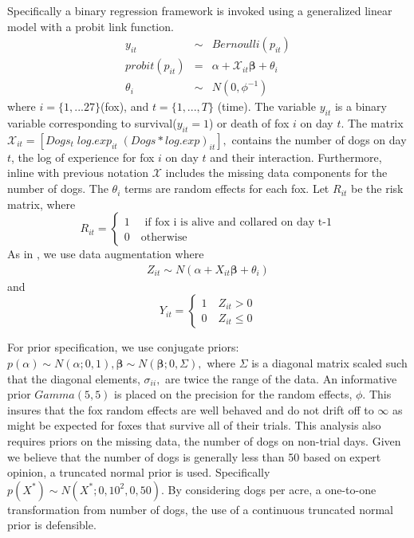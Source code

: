 \documentclass[aoas,preprint]{imsart}
\numberwithin{equation}{section}
\theoremstyle{plain}
\begin{document}
Specifically a binary regression framework is invoked using a generalized linear model with a probit link function.
\begin{eqnarray}
y_{it} &\sim& Bernoulli(p_{it}) \\
probit(p_{it}) & = & \alpha + \mathcal{X}_{it}\boldsymbol{\beta} + \theta_{i} \\
\theta_{i} &\sim& N(0, \phi^{-1})
\end{eqnarray}
where $i = \{1,...27\} $(fox), and $t= \{1,...,T\}$ (time). The variable $y_{it}$ is a binary variable corresponding to survival($y_{it}=1$) or death of fox $i$ on day $t$. The matrix $\mathcal{X}_{it} = [Dogs_t\; log.exp_{it}\; (Dogs*log.exp)_{it}],$ contains the number of dogs on day $t$, the log of experience for fox $i$ on day $t$ and their interaction. Furthermore, inline with previous notation $\mathcal{X}$ includes the missing data components for the number of dogs. The $\theta_i$ terms are random effects for each fox. Let $R_{it}$ be the risk matrix, where
\[
    R_{it}=\left\{
                \begin{array}{ll}
                  1 \quad \text{ if fox i is alive and collared on day t-1}\\
                  0 \quad \text{otherwise}
                \end{array}
              \right.
  \]
  As in \cite{albert}, we use data augmentation where 
  \begin{eqnarray}
  Z_{it} \sim N( \alpha + X_{it}\boldsymbol{\beta} +\theta_{i})
  \end{eqnarray}
  and
\[
    Y_{it}=\left\{
                \begin{array}{ll}
                  1 \quad  Z_{it} > 0\\
                  0 \quad Z_{it} \leq 0
                \end{array}
              \right.
  \]
  
  For prior specification, we use conjugate priors: $p(\alpha) \sim N(\alpha;0,1), \boldsymbol{\beta} \sim N(\boldsymbol{\beta};0,\Sigma),$ where $\Sigma$ is a diagonal matrix scaled such that the diagonal elements, $\sigma_{ii},$ are twice the range of the data. An informative prior $Gamma(5,5)$ is placed on the precision for the random effects, $\phi$. This insures that the fox random effects are well behaved and do not drift off to $\infty$ as might be expected for foxes that survive all of their trials. This analysis also requires priors on the missing data, the number of dogs on non-trial days. Given we believe that the number of dogs is generally less than 50 based on expert opinion, a truncated normal prior is used. Specifically $p(X^{*}) \sim N(X^{*}; 0 ,10^2,0,50)$. By considering dogs per acre, a one-to-one transformation from number of dogs, the use of a continuous truncated normal prior is defensible. 
  
\end{document}

